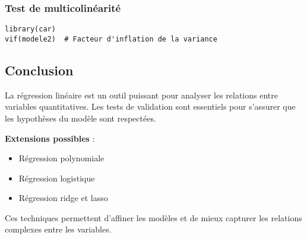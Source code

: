 \documentclass{article}
\begin{document}
\subsubsection{Test de multicolin\'earit\'e}
\begin{verbatim}
library(car)
vif(modele2)  # Facteur d'inflation de la variance
\end{verbatim}

\subsection{Conclusion}
La r\'egression lin\'eaire est un outil puissant pour analyser les relations entre variables quantitatives. Les tests de validation sont essentiels pour s'assurer que les hypoth\`eses du mod\`ele sont respect\'ees.

\textbf{Extensions possibles} :
\begin{itemize}
    \item R\'egression polynomiale
    \item R\'egression logistique
    \item R\'egression ridge et lasso
\end{itemize}

Ces techniques permettent d'affiner les mod\`eles et de mieux capturer les relations complexes entre les variables.
\end{document}
